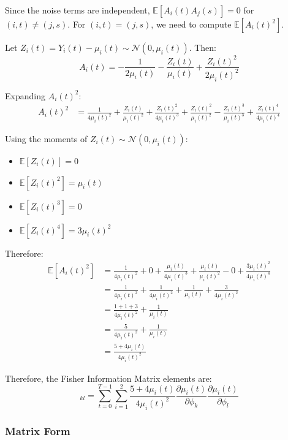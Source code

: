 Since the noise terms are independent, $\mathbb{E}[A_i(t) A_j(s)] = 0$ for $(i,t) \neq (j,s)$. For $(i,t) = (j,s)$, we need to compute $\mathbb{E}[A_i(t)^2]$.

Let $Z_i(t) = Y_i(t) - \mu_i(t) \sim \mathcal{N}(0, \mu_i(t))$. Then:
\begin{equation}
A_i(t) = -\frac{1}{2\mu_i(t)} - \frac{Z_i(t)}{\mu_i(t)} + \frac{Z_i(t)^2}{2\mu_i(t)^2}
\end{equation}

Expanding $A_i(t)^2$:
\begin{align}
A_i(t)^2 &= \frac{1}{4\mu_i(t)^2} + \frac{Z_i(t)}{\mu_i(t)^2} + \frac{Z_i(t)^2}{4\mu_i(t)^3} + \frac{Z_i(t)^2}{\mu_i(t)^2} - \frac{Z_i(t)^3}{\mu_i(t)^3} + \frac{Z_i(t)^4}{4\mu_i(t)^4}
\end{align}

Using the moments of $Z_i(t) \sim \mathcal{N}(0, \mu_i(t))$:
\begin{itemize}
\item $\mathbb{E}[Z_i(t)] = 0$
\item $\mathbb{E}[Z_i(t)^2] = \mu_i(t)$
\item $\mathbb{E}[Z_i(t)^3] = 0$
\item $\mathbb{E}[Z_i(t)^4] = 3\mu_i(t)^2$
\end{itemize}

Therefore:
\begin{align}
\mathbb{E}[A_i(t)^2] &= \frac{1}{4\mu_i(t)^2} + 0 + \frac{\mu_i(t)}{4\mu_i(t)^3} + \frac{\mu_i(t)}{\mu_i(t)^2} - 0 + \frac{3\mu_i(t)^2}{4\mu_i(t)^4} \\
&= \frac{1}{4\mu_i(t)^2} + \frac{1}{4\mu_i(t)^2} + \frac{1}{\mu_i(t)} + \frac{3}{4\mu_i(t)^2} \\
&= \frac{1 + 1 + 3}{4\mu_i(t)^2} + \frac{1}{\mu_i(t)} \\
&= \frac{5}{4\mu_i(t)^2} + \frac{1}{\mu_i(t)} \\
&= \frac{5 + 4\mu_i(t)}{4\mu_i(t)^2}
\end{align}

Therefore, the Fisher Information Matrix elements are:
\begin{equation}
[\mathbf{J}]_{kl} = \sum_{t=0}^{T-1}\sum_{i=1}^{2} \frac{5 + 4\mu_i(t)}{4\mu_i(t)^2} \frac{\partial \mu_i(t)}{\partial \phi_k}\frac{\partial \mu_i(t)}{\partial \phi_l}
\end{equation}

\subsubsection{Matrix Form}

